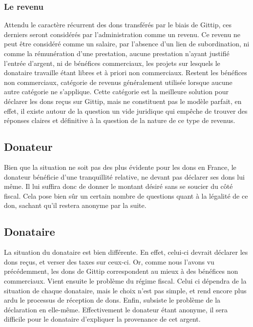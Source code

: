             \subsubsection{Le revenu}
                Attendu le caractère récurrent des dons transférés par
                le biais de Gittip, ces derniers seront considérés par
                l'administration comme un revenu.
                Ce revenu ne peut être considéré comme un salaire, par
                l'absence d'un lien de subordination, ni comme la
                rémunération d'une prestation, aucune prestation n'ayant
                justifié l'entrée d'argent, ni de bénéfices commerciaux,
                les projets sur lesquels le donataire travaille étant libres
                et à priori non commerciaux.
                Restent les bénéfices non commerciaux, catégorie de
                revenus généralement utilisée lorsque aucune autre
                catégorie ne s'applique.
                Cette catégorie est la meilleure solution pour déclarer les
                dons reçus sur Gittip, mais ne constituent pas le modèle
                parfait, en effet, il existe autour de la question un vide
                juridique qui empêche de trouver des réponses claires et
                définitive à la question de la nature de ce type de revenus.

        \subsection{Donateur}
            Bien que la situation ne soit pas des plus évidente pour les dons
            en France, le donateur bénéficie d'une tranquillité relative, ne
            devant pas déclarer ses dons lui même. Il lui suffira donc de
            donner le montant désiré sans se soucier du côté fiscal. Cela
            pose bien sûr un certain nombre de questions quant à la légalité
            de ce don, sachant qu'il restera anonyme par la suite.

        \subsection{Donataire}
            La situation du donataire est bien différente. En effet, celui-ci
            devrait déclarer les dons reçus, et verser des taxes sur ceux-ci.
            Or, comme nous l'avons vu précédemment, les dons de Gittip
            correspondent au mieux à des bénéfices non commerciaux.
            Vient ensuite le problème du régime fiscal. Celui ci dépendra
            de la situation de chaque donataire, mais le choix n'est pas
            simple, et rend encore plus ardu le processus de réception
            de dons.
            Enfin, subsiste le problème de la déclaration en elle-même.
            Effectivement le donateur étant anonyme, il sera difficile
            pour le donataire d'expliquer la provenance de cet argent.

